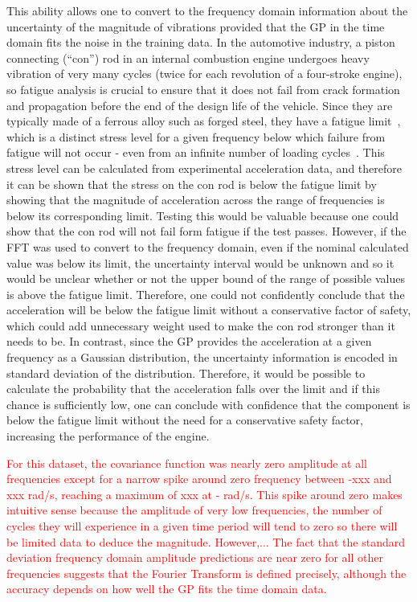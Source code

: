 \documentclass[12pt]{article}
\begin{document}
    This ability allows one to convert to the frequency domain information about the uncertainty of the magnitude of vibrations provided that the GP in the time domain fits the noise in the training data.
    In the automotive industry, a piston connecting (``con'') rod in an internal combustion engine undergoes heavy vibration of very many cycles (twice for each revolution of a four-stroke engine), so fatigue analysis is crucial to ensure that it does not fail from crack formation and propagation before the end of the design life of the vehicle.
    Since they are typically made of a ferrous alloy such as forged steel, they have a fatigue limit~\cite{RoymechFatigue}, which is a distinct stress level for a given frequency below which failure from fatigue will not occur - even from an infinite number of loading cycles~\cite{BeerJohnston1992}.
    This stress level can be calculated from experimental acceleration data, and therefore it can be shown that the stress on the con rod is below the fatigue limit by showing that the magnitude of acceleration across the range of frequencies is below its corresponding limit.
    Testing this would be valuable because one could show that the con rod will not fail form fatigue if the test passes.
    However, if the FFT was used to convert to the frequency domain, even if the nominal calculated value was below its limit, the uncertainty interval would be unknown and so it would be unclear whether or not the upper bound of the range of possible values is above the fatigue limit.
    Therefore, one could not confidently conclude that the acceleration will be below the fatigue limit without a conservative factor of safety, which could add unnecessary weight used to make the con rod stronger than it needs to be.
    In contrast, since the GP provides the acceleration at a given frequency as a Gaussian distribution, the uncertainty information is encoded in standard deviation of the distribution.
    Therefore, it would be possible to calculate the probability that the acceleration falls over the limit and if this chance is sufficiently low, one can conclude with confidence that the component is below the fatigue limit without the need for a conservative safety factor, increasing the performance of the engine.

    \textcolor{red}{For this dataset, the covariance function was nearly zero amplitude at all frequencies except for a narrow spike around zero frequency between -xxx and xxx rad/s, reaching a maximum of xxx at - rad/s.
    This spike around zero makes intuitive sense because the amplitude of very low frequencies, the number of cycles they will experience in a given time period will tend to zero so there will be limited data to deduce the magnitude.
    However,...
    The fact that the standard deviation frequency domain amplitude predictions are near zero for all other frequencies suggests that the Fourier Transform is defined precisely, although the accuracy depends on how well the GP fits the time domain data.}
\end{document}
